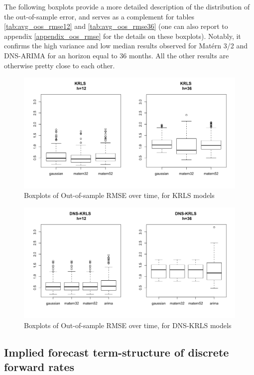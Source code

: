The following boxplots provide a more detailed description of the distribution of the out-of-sample error, and serves as a complement for tables \ref{tab:avg_oos_rmse12} and \ref{tab:avg_oos_rmse36} (one can also report to appendix \ref{appendix_oos_rmse} for the details on these boxplots). Notably, it confirms the high variance and low median results observed for Mat\'ern 3/2 and DNS-ARIMA for an horizon equal to $36$ months. All the other results are otherwise pretty close to each other. 

\begin{figure}[!htb]
\centering
\includegraphics[width=13cm]{gfx/chapter-krls-models/oos_rmse_dns_krls_1}
\caption{Boxplots of Out-of-sample RMSE over time, for KRLS models}
\label{oos_rmse_dns_krls_1}
\end{figure}

\begin{figure}[!htb]
\centering
\includegraphics[width=12cm]{gfx/chapter-krls-models/oos_rmse_dns_krls_2}
\caption{Boxplots of Out-of-sample RMSE over time, for DNS-KRLS models}
\label{oos_rmse_dns_krls_2}
\end{figure}

\newpage

\subsection{Implied forecast term-structure of discrete forward rates}
\label{sec:fcast_curves}

